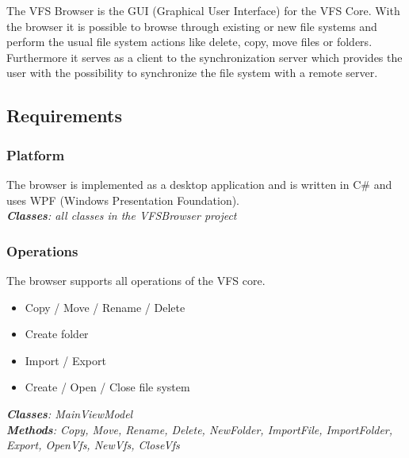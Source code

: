 \documentclass[JCDReport.tex]{subfiles}
\begin{document}
The VFS Browser is the GUI (Graphical User Interface) for the VFS Core.
With the browser it is possible to browse through existing or new file systems and perform the usual file system actions like delete, copy, move files or folders. Furthermore it serves as a client to the synchronization server which provides the user with the possibility to synchronize the file system with a remote server.

\subsection{Requirements}

\subsubsection{Platform}
The browser is implemented as a desktop application and is written in C\# and uses WPF (Windows Presentation Foundation).\\
\textit{\textbf{Classes}: all classes in the VFSBrowser project}

\subsubsection{Operations}
The browser supports all operations of the VFS core.
\begin{itemize}
  \item Copy / Move / Rename / Delete
  \item Create folder
  \item Import / Export
  \item Create / Open / Close file system
\end{itemize}
\textit{\textbf{Classes}: MainViewModel\\
\textbf{Methods}: Copy, Move, Rename, Delete, NewFolder, ImportFile, ImportFolder, Export, OpenVfs, NewVfs, CloseVfs}
\end{document}
